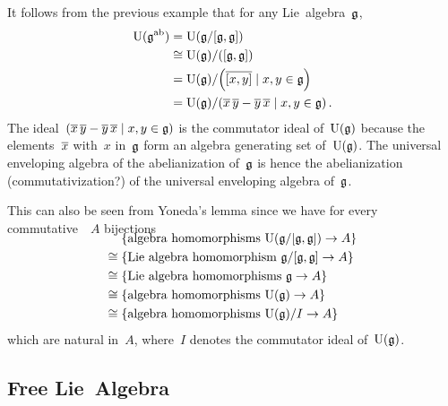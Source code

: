 \begin{example}
  It follows from the previous example that for any Lie~algebra~$\mathfrak{g}$,
  \begin{align*}
    \Univ( \glie^{\ab} )
    &=
    \Univ( \glie/[\glie, \glie] )
    \\
    &\cong
    \Univ(\glie) / \ideal{[\glie, \glie]}
    \\
    &=
    \Univ(\glie)
    /
    \ideal[\Big]{ \class{[x,y]} \suchthat x, y \in \glie }
    \\
    &=
    \Univ(\glie)
    /
    \ideal{
      \class{x} \, \class{y} - \class{y} \, \class{x} 
    \suchthat
      x, y \in \glie
    } \,.
  \end{align*}
  The ideal~$\ideal{ \class{x} \, \class{y} - \class{y} \, \class{x} \suchthat x, y \in \glie }$ is the commutator ideal of~$\operatorname{U}(\mathfrak{g})$ because the elements~$\overline{x}$ with~$x$ in~$\mathfrak{g}$ form an algebra generating set of~$\operatorname{U}(\mathfrak{g})$.
  The universal enveloping algebra of the abelianization of~$\mathfrak{g}$ is hence the abelianization (commutativization?) of the universal enveloping algebra of~$\mathfrak{g}$.
  
  This can also be seen from Yoneda’s lemma since we have for every commutative~{\algebra{$\kf$}}~$A$ bijections
  \begin{align*}
    \SwapAboveDisplaySkip
    {}&
    \{ \textstyle\text{algebra homomorphisms~$\Univ(\glie/[\glie,\glie]) \to A$} \}
    \\
    \cong{}&
    \{ \textstyle\text{Lie~algebra homomorphism~$\glie/[\glie, \glie] \to A$} \}
    \\
    \cong{}&
    \{ \textstyle\text{Lie~algebra homomorphisms~$\glie \to A$} \}
    \\
    \cong{}&
    \{ \textstyle\text{algebra homomorphisms~$\Univ(\glie) \to A$} \}
    \\
    \cong{}&
    \{ \textstyle\text{algebra homomorphisms~$\Univ(\glie)/I \to A$} \}
  \end{align*}
  which are natural in~$A$, where~$I$ denotes the commutator ideal of~$\operatorname{U}(\mathfrak{g})$.
\end{example}





\subsection{Free Lie~Algebra}


